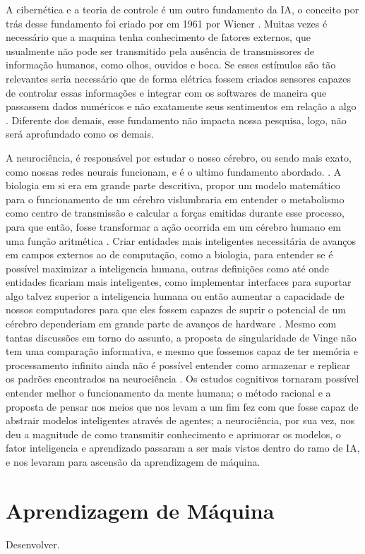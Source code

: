 A cibernética e a teoria de controle é um outro fundamento da IA, o conceito por trás desse fundamento foi criado por em 1961 por Wiener \cite[15]{russell2003artificial}. Muitas vezes é necessário que a maquina tenha conhecimento de fatores externos, que usualmente não pode ser transmitido pela ausência de transmissores de informação humanos, como olhos, ouvidos e boca. Se esses estímulos são tão relevantes seria necessário que de forma elétrica fossem criados sensores capazes de controlar essas informações e integrar com os softwares de maneira que passassem dados numéricos e não exatamente seus sentimentos em relação a algo \cite[3-7]{wiener1961cybernetics}. Diferente dos demais, esse fundamento não impacta nossa pesquisa, logo, não será aprofundado como os demais.

A neurociência, é responsável por estudar o nosso cérebro, ou sendo mais exato, como nossas redes neurais funcionam, e é o ultimo fundamento abordado. \cite[10]{russell2003artificial}. A biologia em si era em grande parte descritiva, propor um modelo matemático para o funcionamento de um cérebro vislumbraria em entender o metabolismo como centro de transmissão e calcular a forças emitidas durante esse processo, para que então, fosse transformar a ação ocorrida em um cérebro humano em uma função aritmética \cite[1-3]{rashevsky1960mathematical}. Criar entidades mais inteligentes necessitária de avanços em campos externos ao de computação, como a biologia, para entender se é possível maximizar a inteligencia humana, outras definições como até onde entidades ficariam mais inteligentes, como implementar interfaces para suportar algo talvez superior a inteligencia humana ou então aumentar a capacidade de nossos computadores para que eles fossem capazes de suprir o potencial de um cérebro dependeriam em grande parte de avanços de hardware \cite[1-2]{vinge1993coming}. Mesmo com tantas discussões em torno do assunto, a proposta de singularidade de Vinge não tem uma comparação informativa, e mesmo que fossemos capaz de ter memória e processamento infinito ainda não é possível entender como armazenar e replicar os padrões encontrados na neurociência \cite[11-12]{russell2003artificial}. Os estudos cognitivos tornaram possível entender melhor o funcionamento da mente humana; o método racional e a proposta de pensar nos meios que nos levam a um fim fez com que fosse capaz de abstrair modelos inteligentes através de agentes; a neurociência, por sua vez, nos deu a magnitude de como transmitir conhecimento e aprimorar os modelos, o fator inteligencia e aprendizado passaram a ser mais vistos dentro do ramo de IA, e nos levaram para ascensão da aprendizagem de máquina.

\section{Aprendizagem de Máquina}
Desenvolver.
